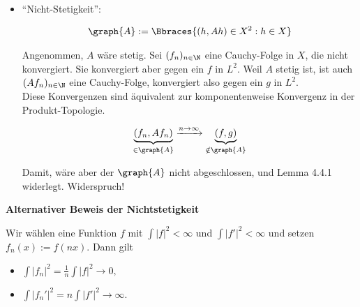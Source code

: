 \begin{solution}
\begin{enumerate}
\begin{itemize}
    \item
    \enquote{Nicht-Stetigkeit}:

    \begin{align*}
      \graph{A} :=
      \Bbraces
      {
        (h, A h) \in X^2:
        h \in X
      }
    \end{align*}

    Angenommen, $A$ wäre stetig.
    Sei $(f_n)_{n \in \N}$ eine Cauchy-Folge in $X$, die nicht konvergiert.
    Sie konvergiert aber gegen ein $f$ in $L^2$.
    Weil $A$ stetig ist, ist auch $(A f_n)_{n \in \N}$ eine Cauchy-Folge, konvergiert also gegen ein $g$ in $L^2$. \\

    Diese Konvergenzen sind äquivalent zur komponentenweise Konvergenz in der Produkt-Topologie.

    \begin{align*}
      \underbrace{(f_n, A f_n)}_{\in \graph{A}}
      \xrightarrow{n \to \infty}
      \underbrace{(f, g)}_{\notin \graph{A}}
    \end{align*}


    Damit, wäre aber der $\graph{A}$ nicht abgeschlossen, und Lemma 4.4.1 widerlegt.
    Widerspruch!

  \end{itemize}

\end{enumerate}

\end{solution}

\begin{solution}

\textbf{Alternativer Beweis der Nichtstetigkeit}

Wir wählen eine Funktion $f$ mit $\int |f|^2 < \infty$ und $\int |f'|^2 < \infty$ und setzen $f_n(x) := f(nx).$ Dann gilt
\begin{itemize}
  \item $\int |f_n|^2 = \frac{1}{n} \int |f|^2 \longrightarrow 0,$
  \item $\int|f_n'|^2 = n \int |f'|^2 \longrightarrow \infty.$
\end{itemize}

\end{solution}

